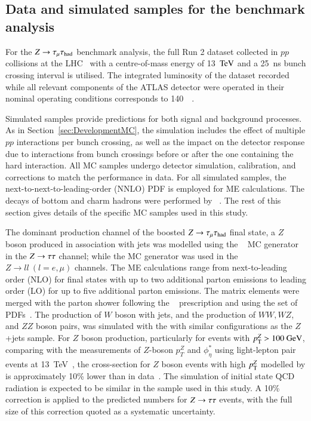     \subsection{Data and simulated samples for the benchmark analysis} \label{sec:Benchmark}
        For the $Z\rightarrow\tau_\mathrm{\mu}\tau_{\text{had}}$ benchmark analysis, the full Run 2 dataset collected in $pp$ collisions at the LHC~\cite{Evans:2008zzb} with a centre-of-mass
        energy of 13~$\text{TeV}$ and a 25~ns bunch crossing interval is utilised. The integrated luminosity of the dataset recorded
        while all relevant components of the ATLAS detector were operated in their nominal operating
        conditions  corresponds to 140~\ifb~\cite{DAPR-2021-01}. 

        Simulated samples provide predictions for both signal and background processes.
        As in Section~\ref{sec:DevelopmentMC},
        the simulation includes the effect of multiple \(pp\) interactions per bunch crossing, as well as the impact on the detector response due to
        interactions from bunch crossings before or after the one containing the hard interaction. 
        All MC samples undergo detector simulation, calibration, and corrections to match the performance in data. 
        For all simulated samples, the next-to-next-to-leading-order (NNLO) PDF is employed for ME calculations.
        The decays of bottom and charm hadrons
        were performed by \EVTGEN~\cite{Lange:2001uf}.
        The rest of this section gives details of the specific MC samples used in this study.

        The dominant production channel of the boosted $Z\rightarrow\tau_\mathrm{\mu}\tau_{\text{had}}$ final state, 
        a $Z$ boson produced in association with jets was modelled using the
        \SHERPA[2.2.14]~\cite{Bothmann:2019yzt} MC generator in the $Z \rightarrow \tau\tau$ channel;
        while the \SHERPA[2.2.11] MC generator was used in the $Z\rightarrow ll~(l=e,\mu)$ channels.
        The ME calculations range from next-to-leading order (NLO) for final 
        states with up to two additional parton emissions to leading order 
        (LO) for up to five additional parton emissions. 
        The matrix elements were merged with the \SHERPA parton shower following the \MEPSatLO~\cite{Hoeche:2009rj} prescription and using the \NNPDF[3.0nnlo] set of PDFs~\cite{Ball:2014uwa}.
        The production of $W$ boson with jets, and the production of $WW, WZ$, and $ZZ$ boson pairs, was simulated with the \SHERPA[2.2.11] with similar configurations as the $Z$+jets sample.
        For $Z$ boson production, particularly for events with $p_{\text{T}}^{Z} > 100~\text{GeV}$, comparing with the measurements of $Z$-boson $p_T^{Z}$ 
        and $\phi^*_\eta$ using light-lepton pair events at 13~TeV~\cite{STDM-2018-14},
        the cross-section for $Z$ boson events with high $p_{\text{T}}^{Z}$ modelled by \SHERPA[2.2.11] is 
        approximately 10\% lower than in data~\cite{PMGR-2021-01}. The simulation of initial state QCD 
        radiation is expected to be similar in the \SHERPA[2.2.14] sample used in this study. A 10\% 
        correction is applied to the predicted numbers for 
        $Z \rightarrow \tau\tau$ events, with the full size of this correction quoted as a systematic uncertainty.


